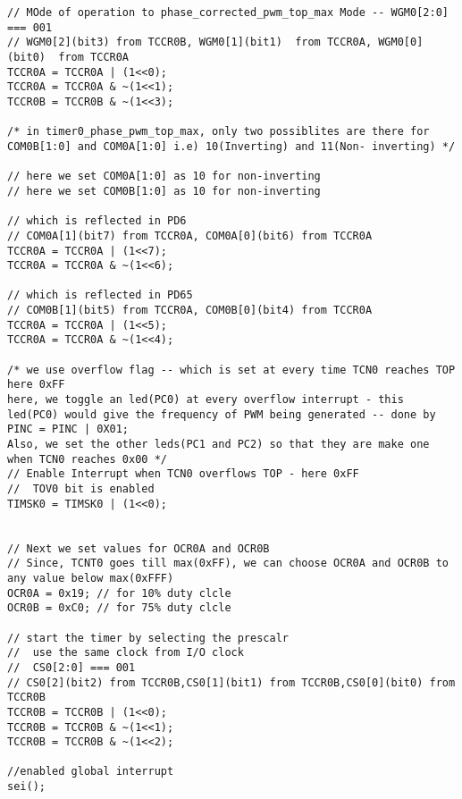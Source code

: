 \begin{verbatim}
// MOde of operation to phase_corrected_pwm_top_max Mode -- WGM0[2:0] === 001
// WGM0[2](bit3) from TCCR0B, WGM0[1](bit1)  from TCCR0A, WGM0[0](bit0)  from TCCR0A
TCCR0A = TCCR0A | (1<<0);
TCCR0A = TCCR0A & ~(1<<1);
TCCR0B = TCCR0B & ~(1<<3);	

/* in timer0_phase_pwm_top_max, only two possiblites are there for COM0B[1:0] and COM0A[1:0] i.e) 10(Inverting) and 11(Non- inverting) */

// here we set COM0A[1:0] as 10 for non-inverting
// here we set COM0B[1:0] as 10 for non-inverting

// which is reflected in PD6
// COM0A[1](bit7) from TCCR0A, COM0A[0](bit6) from TCCR0A
TCCR0A = TCCR0A | (1<<7);
TCCR0A = TCCR0A & ~(1<<6);

// which is reflected in PD65
// COM0B[1](bit5) from TCCR0A, COM0B[0](bit4) from TCCR0A
TCCR0A = TCCR0A | (1<<5);
TCCR0A = TCCR0A & ~(1<<4);

/* we use overflow flag -- which is set at every time TCN0 reaches TOP here 0xFF
here, we toggle an led(PC0) at every overflow interrupt - this led(PC0) would give the frequency of PWM being generated -- done by PINC = PINC | 0X01;
Also, we set the other leds(PC1 and PC2) so that they are make one when TCN0 reaches 0x00 */
// Enable Interrupt when TCN0 overflows TOP - here 0xFF
//  TOV0 bit is enabled
TIMSK0 = TIMSK0 | (1<<0);


// Next we set values for OCR0A and OCR0B
// Since, TCNT0 goes till max(0xFF), we can choose OCR0A and OCR0B to any value below max(0xFFF)
OCR0A = 0x19; // for 10% duty clcle
OCR0B = 0xC0; // for 75% duty clcle

// start the timer by selecting the prescalr
//  use the same clock from I/O clock
//  CS0[2:0] === 001
// CS0[2](bit2) from TCCR0B,CS0[1](bit1) from TCCR0B,CS0[0](bit0) from TCCR0B
TCCR0B = TCCR0B | (1<<0);
TCCR0B = TCCR0B & ~(1<<1);
TCCR0B = TCCR0B & ~(1<<2);

//enabled global interrupt
sei();
\end{verbatim}

